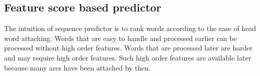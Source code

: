 

\subsection{Feature score based predictor}
The intuition of sequence predictor is to rank words 
according to the ease of head word attaching. 
Words that are easy to handle and processed earlier 
can be processed without high order features.
Words that are processed later are harder and may require high order
features. Such high order features are available later because many arcs
have been attached by then.

